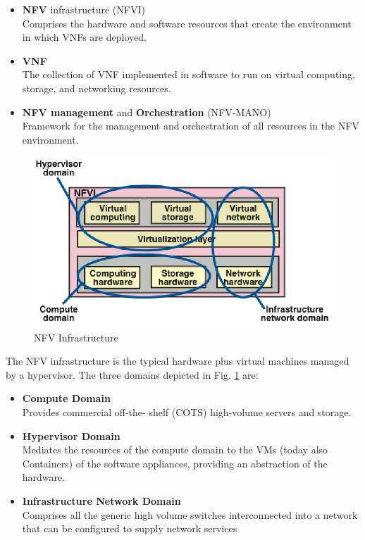 \begin{itemize}
   \item \textbf{NFV} infrastructure (NFVI)\\
   Comprises the hardware and software resources that create the environment in which VNFs are deployed.
   \item \textbf{VNF}\\ 
   The collection of VNF implemented in software to run on virtual computing, storage, and networking resources.
   \item \textbf{NFV management} and \textbf{Orchestration} (NFV-MANO)\\
   Framework for the management and orchestration of all resources in the NFV environment.
\end{itemize}

\begin{figure}[htbp]
   \centering
   \includegraphics{images/NFV_infr.png}
   \caption{NFV Infrastructure}
   \label{fig:NFV_infr}
\end{figure}
The NFV infrastructure is the typical hardware plus virtual machines managed by a hypervisor.
The three domains depicted in Fig. \ref{fig:NFV_infr} are:
\begin{itemize}
   \item \textbf{Compute Domain}\\
   Provides commercial off-the- shelf (COTS) high-volume servers and storage.
   \item \textbf{Hypervisor Domain}\\
   Mediates the resources of the compute domain to the VMs (today also Containers) of the software appliances, providing an abstraction of the hardware.
   \item \textbf{Infrastructure Network Domain}\\
   Comprises all the generic high volume switches interconnected into a network that can be configured to supply network services
\end{itemize}

